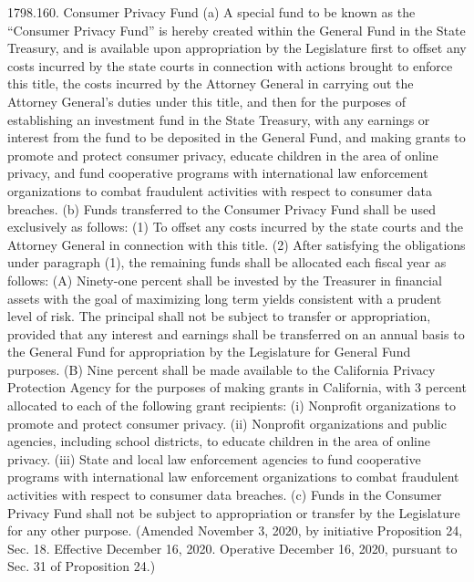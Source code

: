 1798.160.  Consumer Privacy Fund
(a) A special fund to be known as the “Consumer Privacy Fund” is hereby created within the General Fund in the State Treasury, and is available upon appropriation by the Legislature first to offset any costs incurred by the state courts in connection with actions brought to enforce this title, the costs incurred by the Attorney General in carrying out the Attorney General’s duties under this title, and then for the purposes of establishing an investment fund in the State Treasury, with any earnings or interest from the fund to be deposited in the General Fund, and making grants to promote and protect consumer privacy, educate children in the area of online privacy, and fund cooperative programs with international law enforcement organizations to combat fraudulent activities with respect to consumer data breaches.
(b) Funds transferred to the Consumer Privacy Fund shall be used exclusively as follows:
(1) To offset any costs incurred by the state courts and the Attorney General in connection with this title.
(2) After satisfying the obligations under paragraph (1), the remaining funds shall be allocated each fiscal year as follows:
(A) Ninety-one percent shall be invested by the Treasurer in financial assets with the goal of maximizing long term yields consistent with a prudent level of risk. The principal shall not be subject to transfer or appropriation, provided that any interest and earnings shall be transferred on an annual basis to the General Fund for appropriation by the Legislature for General Fund purposes.
(B) Nine percent shall be made available to the California Privacy Protection Agency for the purposes of making grants in California, with 3 percent allocated to each of the following grant recipients:
(i) Nonprofit organizations to promote and protect consumer privacy.
(ii) Nonprofit organizations and public agencies, including school districts, to educate children in the area of online privacy.
(iii) State and local law enforcement agencies to fund cooperative programs with international law enforcement organizations to combat fraudulent activities with respect to consumer data breaches.
(c) Funds in the Consumer Privacy Fund shall not be subject to appropriation or transfer by the Legislature for any other purpose.
(Amended November 3, 2020, by initiative Proposition 24, Sec. 18. Effective December 16, 2020. Operative December 16, 2020, pursuant to Sec. 31 of Proposition 24.)

